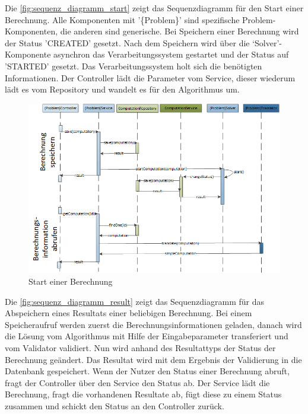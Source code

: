 \FloatBarrier
\newpage

Die \autoref{fig:sequenz_diagramm_start} zeigt das Sequenzdiagramm für den Start einer Berechnung. Alle Komponenten mit '\{Problem\}' sind spezifische Problem-Komponenten, 
die anderen sind generische. Bei Speichern einer Berechnung wird der Status 'CREATED' gesetzt. Nach dem Speichern wird über die `Solver'-Komponente asynchron das Verarbeitungssystem 
gestartet und der Status auf 'STARTED' gesetzt. Das Verarbeitungssystem holt sich die benötigten Informationen. Der Controller lädt die Parameter vom Service, dieser wiederum lädt es vom 
Repository und wandelt es für den Algorithmus um.

\begin{figure}[h]
\centering
\includegraphics[scale=0.74]{images/visio/sequenz_diagramm_start.png}
\caption[Start einer Berechnung]{Start einer Berechnung \selfmade{}}
\label{fig:sequenz_diagramm_start}
\end{figure}

\newpage

Die \autoref{fig:sequenz_diagramm_result} zeigt das Sequenzdiagramm für das Abspeichern eines Resultats einer beliebigen Berechnung. Bei einem Speicheraufruf werden zuerst die 
Berechnungsinformationen geladen, danach wird die Lösung vom Algorithmus mit Hilfe der Eingabeparameter transferiert und vom Validator validiert. Nun wird anhand des Resultattyps der 
Status der Berechnung geändert. Das Resultat wird mit dem Ergebnis der Validierung in die Datenbank gespeichert. Wenn der Nutzer den Status einer Berechnung abruft, fragt der Controller 
über den Service den Status ab. Der Service lädt die Berechnung, fragt die vorhandenen Resultate ab, fügt diese zu einem Status zusammen und schickt den Status an den Controller zurück.

